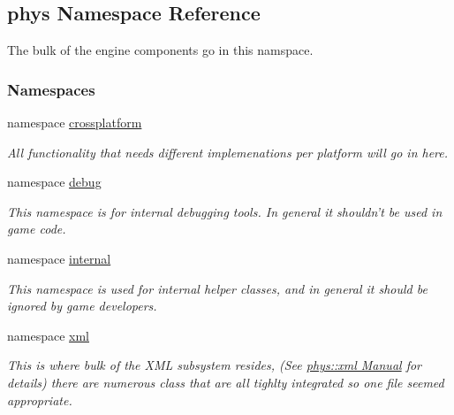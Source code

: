 \hypertarget{namespacephys}{
\subsection{phys Namespace Reference}
\label{namespacephys}
}


The bulk of the engine components go in this namspace.  


\subsubsection*{Namespaces}
\begin{DoxyCompactItemize}
\item 
namespace \hyperlink{namespacephys_1_1crossplatform}{crossplatform}


\begin{DoxyCompactList}\small\item\em All functionality that needs different implemenations per platform will go in here. \item\end{DoxyCompactList}

\item 
namespace \hyperlink{namespacephys_1_1debug}{debug}


\begin{DoxyCompactList}\small\item\em This namespace is for internal debugging tools. In general it shouldn't be used in game code. \item\end{DoxyCompactList}

\item 
namespace \hyperlink{namespacephys_1_1internal}{internal}


\begin{DoxyCompactList}\small\item\em This namespace is used for internal helper classes, and in general it should be ignored by game developers. \item\end{DoxyCompactList}

\item 
namespace \hyperlink{namespacephys_1_1xml}{xml}


\begin{DoxyCompactList}\small\item\em This is where bulk of the XML subsystem resides, (See \hyperlink{XMLManual}{phys::xml Manual} for details) there are numerous class that are all tighlty integrated so one file seemed appropriate. \item\end{DoxyCompactList}

\end{DoxyCompactItemize}

